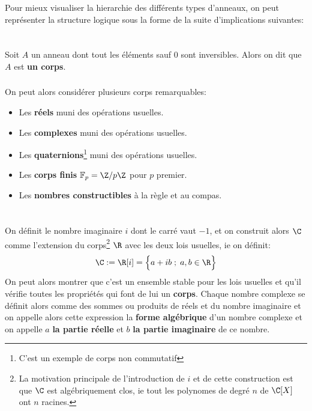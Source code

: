\subsection*{}
Pour mieux visualiser la hierarchie des différents types d'anneaux, on peut représenter la structure logique sous la forme de la suite d'implications suivantes:
\begin{center}
\end{center}
\chapter*{}
Soit \(A\) un anneau dont tout les éléments sauf \(0\) sont inversibles. Alors on dit que \(A\) est \textbf{un corps}.

\subsection*{}
On peut alors considérer plusieurs corps remarquables:
\begin{itemize}
   \item Les \textbf{réels} muni des opérations usuelles.
   \item Les \textbf{complexes} muni des opérations usuelles.
   \item Les \textbf{quaternions}\footnote[1]{C'est un exemple de corps non commutatif} muni des opérations usuelles.
   \item Les \textbf{corps finis} \(\mathbb{F}_p = \Z/p\Z\) pour \(p\) premier.
   \item Les \textbf{nombres constructibles} à la règle et au compas.
\end{itemize}

\chapter*{} %

On définit le nombre imaginaire \(i\) dont le carré vaut \(-1\), et on construit alors \(\C\) comme l'extension du corps\footnote[1]{La motivation principale de l'introduction de \(i\) et de cette construction est que \(\C\) est algébriquement clos, ie tout les polynomes de degré \(n\) de \(\C[X]\) ont \(n\) racines.} \(\R\) avec les deux lois usuelles, ie on définit:
\[
   \C := \R[i] = \Bigl\{a + ib \; ; \; a, b \in \R \Bigl\}
\]
On peut alors montrer que c'est un ensemble stable pour les lois usuelles et qu'il vérifie toutes les propriétés qui font de lui un \textbf{corps}.\+
Chaque nombre complexe se définit alors comme des sommes ou produits de réels et du nombre imaginaire et on appelle alors cette expression la \textbf{forme algébrique} d'un nombre complexe et on appelle \(a\) \textbf{la partie réelle} et \(b\) \textbf{la partie imaginaire} de ce nombre. \<

